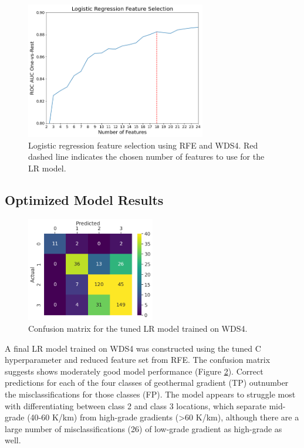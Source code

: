 \begin{figure}[!htp]
\centering
\includegraphics[width=0.70\textwidth]{templates/images/Figure-LR_feature_selection.png}
\singlespacing
\caption[Logistic regression feature selection]{Logistic regression feature selection using RFE and WDS4. Red dashed line indicates the chosen number of features to use for the LR model.}
\label{fig:logreg_rfe}
\end{figure}

\subsection{Optimized Model Results}\label{ch5:lr_final_results}
\begin{figure}%
\centering
\includegraphics[width=0.5\textwidth]{templates/images/Figure-LR-ConfusionMatrix.png}
\singlespacing
\caption[Logistic regression confusion matrix]{Confusion matrix for the tuned LR model trained on WDS4.}
\label{fig:logreg_conf_matrix}
\end{figure}
A final LR model trained on WDS4 was constructed using the tuned C hyperparameter and reduced feature set from RFE. The confusion matrix suggests shows moderately good model performance (Figure \ref{fig:logreg_conf_matrix}). Correct predictions for each of the four classes of geothermal gradient (TP) outnumber the misclassifications for those classes (FP). The model appears to struggle most with differentiating between class 2 and class 3 locations, which separate mid-grade (40-60 K/km) from high-grade gradients (>60 K/km), although there are a large number of misclassifications (26) of low-grade gradient as high-grade as well.

